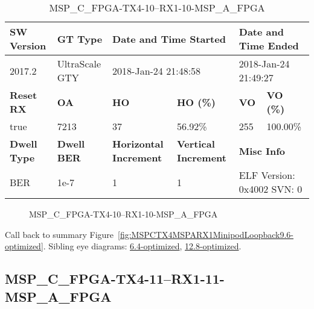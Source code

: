 \begin{table}[h]
\centering
\caption{MSP\_C\_FPGA-TX4-10--RX1-10-MSP\_A\_FPGA}
\label{tab:MSPCFPGATX410RX110MSPAFPGA9.6-optimized}
\begin{tabular}{@{}|l|l|l|l|l|l|@{}}
\toprule
\textbf{SW Version}                & \textbf{GT Type}   & \multicolumn{2}{l|}{\textbf{Date and Time Started}}            & \multicolumn{2}{l|}{\textbf{Date and Time Ended}}        \\ \midrule
2017.2                       & UltraScale GTY          & \multicolumn{2}{l|}{2018-Jan-24 21:48:58}                   & \multicolumn{2}{l|}{2018-Jan-24 21:49:27}               \\ \midrule
\textbf{Reset RX}                  & \textbf{OA} & \textbf{HO}   & \textbf{HO (\%)} & \textbf{VO} & \textbf{VO (\%)} \\ \midrule
true & 7213        & 37          & 56.92\%        & 255        & 100.00\%       \\ \midrule
\textbf{Dwell Type}                & \textbf{Dwell BER} & \textbf{Horizontal Increment} & \textbf{Vertical Increment}    & \multicolumn{2}{l|}{\textbf{Misc Info}}                  \\ \midrule
BER                            & 1e-7        & 1        & 1           & \multicolumn{2}{l|}{ELF Version: 0x4002 SVN: 0}                         \\ \bottomrule
\end{tabular}
\end{table}

\begin{figure}[h]
\caption{MSP\_C\_FPGA-TX4-10--RX1-10-MSP\_A\_FPGA} \label{fig:MSPCFPGATX410RX110MSPAFPGA9.6-optimized}
\end{figure}

Call back to summary Figure~\ref{fig:MSPCTX4MSPARX1MinipodLoopback9.6-optimized}.
Sibling eye diagrams: \hyperref[sec:MSPCFPGATX410RX110MSPAFPGA6.4-optimized]{6.4-optimized}, \hyperref[sec:MSPCFPGATX410RX110MSPAFPGA12.8-optimized]{12.8-optimized}.

\clearpage
\newpage


\subsection{MSP\_C\_FPGA-TX4-11--RX1-11-MSP\_A\_FPGA}\label{sec:MSPCFPGATX411RX111MSPAFPGA9.6-optimized}

